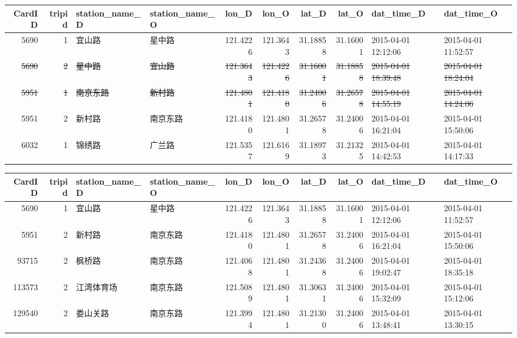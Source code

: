 \documentclass[
  a4paper,
  DIV=11,
  numbers=noendperiod]{scrartcl}
\begin{document}
\begin{table}
\centering
\begin{tabular}{r|r|l|l|r|r|r|r|l|l}
\hline
CardID & tripid & station\_name\_D & station\_name\_O & lon\_D & lon\_O & lat\_D & lat\_O & dat\_time\_D & dat\_time\_O\\
\hline
5690 & 1 & 宜山路 & 星中路 & 121.4226 & 121.3643 & 31.18858 & 31.16001 & 2015-04-01 12:12:06 & 2015-04-01 11:52:57\\
\hline
\sout{5690} & \sout{2} & \sout{星中路} & \sout{宜山路} & \sout{121.3643} & \sout{121.4226} & \sout{31.16001} & \sout{31.18858} & \sout{2015-04-01 18:39:48} & \sout{2015-04-01 18:24:04}\\
\hline
\sout{5951} & \sout{1} & \sout{南京东路} & \sout{新村路} & \sout{121.4801} & \sout{121.4180} & \sout{31.24006} & \sout{31.26578} & \sout{2015-04-01 14:55:19} & \sout{2015-04-01 14:24:06}\\
\hline
5951 & 2 & 新村路 & 南京东路 & 121.4180 & 121.4801 & 31.26578 & 31.24006 & 2015-04-01 16:21:04 & 2015-04-01 15:50:06\\
\hline
6032 & 1 & 锦绣路 & 广兰路 & 121.5357 & 121.6169 & 31.18973 & 31.21325 & 2015-04-01 14:42:53 & 2015-04-01 14:17:33\\
\hline
\end{tabular}
\end{table}

\begin{table}
\centering
\begin{tabular}{r|r|l|l|r|r|r|r|l|l}
\hline
CardID & tripid & station\_name\_D & station\_name\_O & lon\_D & lon\_O & lat\_D & lat\_O & dat\_time\_D & dat\_time\_O\\
\hline
5690 & 1 & 宜山路 & 星中路 & 121.4226 & 121.3643 & 31.18858 & 31.16001 & 2015-04-01 12:12:06 & 2015-04-01 11:52:57\\
\hline
5951 & 2 & 新村路 & 南京东路 & 121.4180 & 121.4801 & 31.26578 & 31.24006 & 2015-04-01 16:21:04 & 2015-04-01 15:50:06\\
\hline
93715 & 2 & 枫桥路 & 南京东路 & 121.4068 & 121.4801 & 31.24368 & 31.24006 & 2015-04-01 19:02:47 & 2015-04-01 18:35:18\\
\hline
113573 & 2 & 江湾体育场 & 南京东路 & 121.5089 & 121.4801 & 31.30631 & 31.24006 & 2015-04-01 15:32:09 & 2015-04-01 15:12:06\\
\hline
129540 & 2 & 娄山关路 & 南京东路 & 121.3994 & 121.4801 & 31.21300 & 31.24006 & 2015-04-01 13:48:41 & 2015-04-01 13:30:15\\
\hline
\end{tabular}
\end{table}
\end{document}
